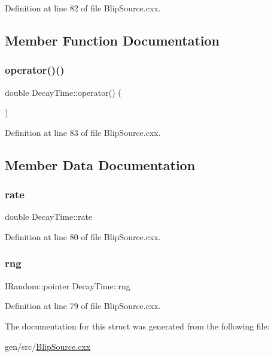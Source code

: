 Definition at line 82 of file Blip\+Source.\+cxx.



\subsection{Member Function Documentation}
\mbox{\label{struct_decay_time_ae7d39c94926359f301446df6c7acd5db}} 
\subsubsection{\texorpdfstring{operator()()}{operator()()}}
{\footnotesize\ttfamily double Decay\+Time\+::operator() (\begin{DoxyParamCaption}{ }\end{DoxyParamCaption})\hspace{0.3cm}{\ttfamily [inline]}}



Definition at line 83 of file Blip\+Source.\+cxx.



\subsection{Member Data Documentation}
\mbox{\label{struct_decay_time_a6fda8b08aa27b4ff40ada16d00c67363}} 
\subsubsection{\texorpdfstring{rate}{rate}}
{\footnotesize\ttfamily double Decay\+Time\+::rate}



Definition at line 80 of file Blip\+Source.\+cxx.

\mbox{\label{struct_decay_time_a12b72a0c00ea60b09bb0fd03bea2b519}} 
\subsubsection{\texorpdfstring{rng}{rng}}
{\footnotesize\ttfamily I\+Random\+::pointer Decay\+Time\+::rng}



Definition at line 79 of file Blip\+Source.\+cxx.



The documentation for this struct was generated from the following file\+:\begin{DoxyCompactItemize}
\item 
gen/src/\hyperlink{_blip_source_8cxx}{Blip\+Source.\+cxx}\end{DoxyCompactItemize}
